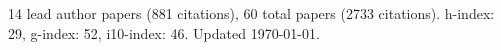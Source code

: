 14 lead author papers (881 citations),
60 total papers (2733 citations).\newline
h-index: 29, g-index: 52, i10-index: 46. Updated \today.